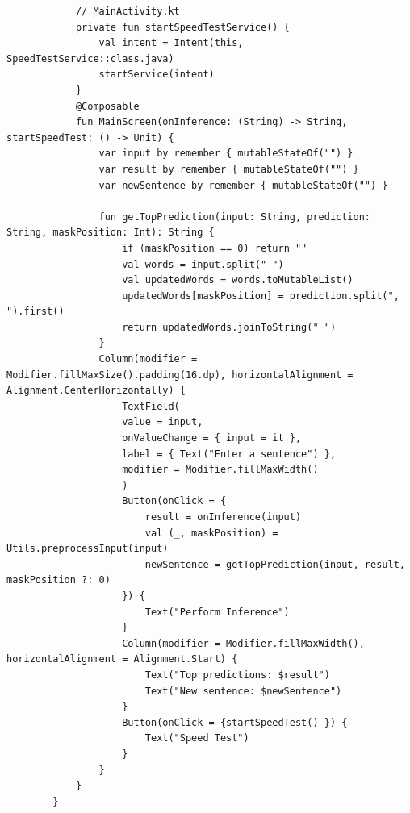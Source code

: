     \begin{listing}
        \begin{verbatim}
            // MainActivity.kt
            private fun startSpeedTestService() {
                val intent = Intent(this, SpeedTestService::class.java)
                startService(intent)
            }
            @Composable
            fun MainScreen(onInference: (String) -> String, startSpeedTest: () -> Unit) {
                var input by remember { mutableStateOf("") }
                var result by remember { mutableStateOf("") }
                var newSentence by remember { mutableStateOf("") }
                
                fun getTopPrediction(input: String, prediction: String, maskPosition: Int): String {
                    if (maskPosition == 0) return ""
                    val words = input.split(" ")
                    val updatedWords = words.toMutableList()
                    updatedWords[maskPosition] = prediction.split(", ").first()
                    return updatedWords.joinToString(" ")
                }
                Column(modifier = Modifier.fillMaxSize().padding(16.dp), horizontalAlignment = Alignment.CenterHorizontally) {
                    TextField(
                    value = input,
                    onValueChange = { input = it },
                    label = { Text("Enter a sentence") },
                    modifier = Modifier.fillMaxWidth()
                    )
                    Button(onClick = {
                        result = onInference(input)
                        val (_, maskPosition) = Utils.preprocessInput(input)
                        newSentence = getTopPrediction(input, result, maskPosition ?: 0)
                    }) {
                        Text("Perform Inference")
                    }
                    Column(modifier = Modifier.fillMaxWidth(), horizontalAlignment = Alignment.Start) {
                        Text("Top predictions: $result")
                        Text("New sentence: $newSentence")
                    }
                    Button(onClick = {startSpeedTest() }) {
                        Text("Speed Test")
                    }
                }
            }
        }
    \end{verbatim}
    \caption[\texttt{MainActivity.kt} (deel 3)]{Het laatste deel van \texttt{MainActivity.kt} omvat de gebruikersinterface en de functie \texttt{MainScreen}, waarin gebruikers interacties zoals het starten van de inferentie en snelheids testen worden afgehandeld.}
    \label{lst:main-activity-part3}
\end{listing}

